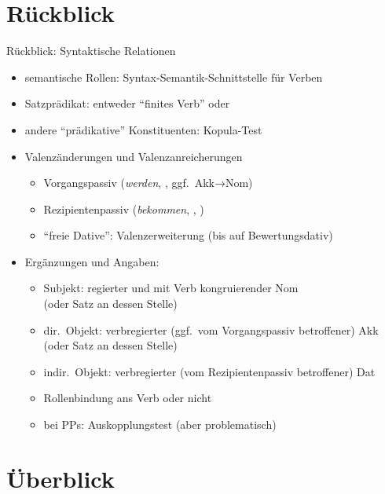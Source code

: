 \section{Rückblick}

\begin{frame}
  {Rückblick: Syntaktische Relationen}
  \pause
  \begin{itemize}[<+->]
    \item semantische Rollen: Syntax-Semantik-Schnittstelle für Verben
      \Halbzeile
    \item Satzprädikat: entweder "`finites Verb"' oder 
    \item andere "`prädikative"' Konstituenten: \alert{Kopula-Test}
      \Halbzeile
    \item \alert{Valenzänderungen und Valenzanreicherungen}
      \begin{itemize}[<+->]
        \item Vorgangspassiv (\textit{werden}, , \alert{ggf.\ Akk→Nom})
        \item Rezipientenpassiv (\textit{bekommen}, , )
        \item "`freie Dative"': Valenzerweiterung (bis auf Bewertungsdativ)
      \end{itemize}
      \Halbzeile
    \item Ergänzungen und Angaben:
      \begin{itemize}[<+->]
        \item Subjekt: regierter und mit Verb kongruierender \alert{Nom}\\
           (oder Satz an dessen Stelle)
         \item dir.\ Objekt: verbregierter (ggf.\ vom Vorgangspassiv betroffener) \alert{Akk}\\
          (oder Satz an dessen Stelle)
        \item indir.\ Objekt: verbregierter (vom Rezipientenpassiv betroffener) \alert{Dat}
        \item \alert{Rollenbindung ans Verb} oder nicht
        \item bei PPs: Auskopplungstest (aber problematisch)
      \end{itemize}
  \end{itemize}
\end{frame}


\section{Überblick}

